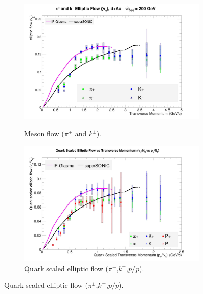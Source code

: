 \begin{figure}[hbtp]
\centering
    \begin{subfigure}[h]{0.48\textwidth}
    \centering
    \includegraphics[width=1\textwidth]{results/v2mesons.jpg}
    \label{fig:mesonflow}
    \caption{Meson flow ($\pi^{\pm}$ and $k^{\pm}$).}
	\end{subfigure}
    \begin{subfigure}[h]{0.48\textwidth}
    \centering
    \includegraphics[width=1\textwidth]{results/v2NqvspTwmodels.jpg}
    \caption{Quark scaled elliptic flow ($\pi^{\pm}$,$k^{\pm}$,$p/\bar{p}$).}
    \label{fig:qscalemesonflow}


\end{subfigure}
\end{figure}
